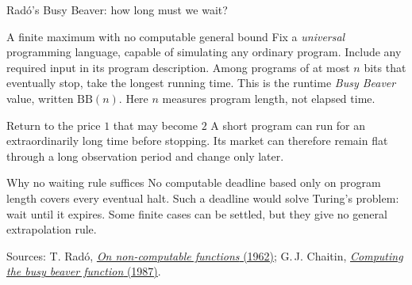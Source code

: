 \documentclass{beamer}
\newcommand{\doiref}[2]{%
  \href{https://doi.org/#1}{\textcolor{blue!65!black}{#2}}}
\newcommand{\sourcefoot}[1]{%
  \par\vfill{\fontsize{6.3}{7.5}\selectfont\color{black!65}Sources: #1\par}}
\begin{document}
\begin{frame}{Rad\'o's Busy Beaver: how long must we wait?}
\small
\begin{block}{A finite maximum with no computable general bound}
Fix a \emph{universal} programming language, capable of simulating any
ordinary program. Include any required input in its program description.
Among programs of at most $n$ bits that eventually stop, take the longest
running time. This is the runtime
\emph{Busy Beaver} value, written $\mathrm{BB}(n)$.
Here $n$ measures program length, not elapsed time.
\end{block}
\begin{exampleblock}{Return to the price $1$ that may become $2$}
A short program can run for an extraordinarily long time before stopping.
Its market can therefore remain flat through a long observation period and
change only later.
\end{exampleblock}
\begin{alertblock}{Why no waiting rule suffices}
No computable deadline based only on program length covers every eventual
halt. Such a deadline would solve Turing's problem: wait until it expires.
Some finite cases can be settled, but they give no general extrapolation rule.
\end{alertblock}
\sourcefoot{T. Rad\'o,
\doiref{10.1002/j.1538-7305.1962.tb00480.x}{\emph{On non-computable functions} (1962)};
G.\,J. Chaitin,
\doiref{10.1007/978-1-4612-4808-8_28}{\emph{Computing the busy beaver function} (1987)}.}
\end{frame}
\end{document}
